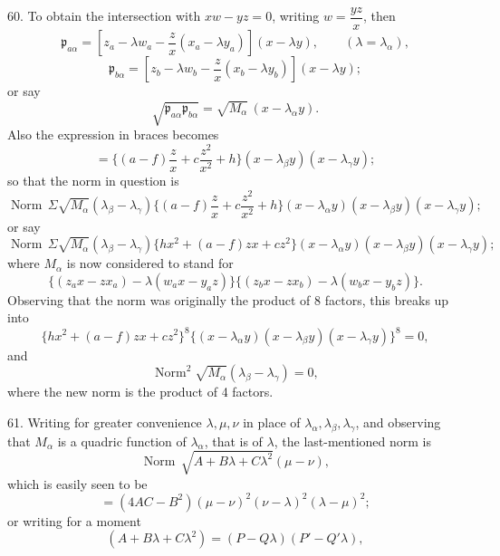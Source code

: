 \documentclass[11pt,a4paper]{article}
\newcommand{\p}{\mathfrak p}
\newcommand{\Norm}{\operatorname{Norm}}
\begin{document}
60. To obtain the intersection with $xw-yz=0$, writing $w=\dfrac{yz}{x}$, then
\[
\p_{a\alpha}=\left[z_a-\lambda w_a-\frac{z}{x}(x_a-\lambda y_a)\right]
(x-\lambda y),\qquad(\lambda=\lambda_\alpha),
\]
\[
\p_{b\alpha}=\left[z_b-\lambda w_b-\frac{z}{x}(x_b-\lambda y_b)\right]
(x-\lambda y);
\]
or say
\[
\sqrt{\p_{a\alpha}\p_{b\alpha}}=\sqrt{M_\alpha}\,(x-\lambda_\alpha y).
\]
Also the expression in braces becomes
\[
=\{(a-f)\frac{z}{x}+c\frac{z^2}{x^2}+h\}(x-\lambda_\beta y)(x-\lambda_\gamma y);
\]
so that the norm in question is
\[
\Norm\,\Sigma\sqrt{M_\alpha}(\lambda_\beta-\lambda_\gamma)
\{(a-f)\frac{z}{x}+c\frac{z^2}{x^2}+h\}
(x-\lambda_\alpha y)(x-\lambda_\beta y)(x-\lambda_\gamma y);
\]
or say
\[
\Norm\,\Sigma\sqrt{M_\alpha}(\lambda_\beta-\lambda_\gamma)
\{hx^2+(a-f)zx+cz^2\}
(x-\lambda_\alpha y)(x-\lambda_\beta y)(x-\lambda_\gamma y);
\]
where $M_\alpha$ is now considered to stand for
\[
\{(z_ax-zx_a)-\lambda(w_ax-y_az)\}
\{(z_bx-zx_b)-\lambda(w_bx-y_bz)\}.
\]
Observing that the norm was originally the product of 8 factors, this breaks up into
\[
\{hx^2+(a-f)zx+cz^2\}^8
\{(x-\lambda_\alpha y)(x-\lambda_\beta y)(x-\lambda_\gamma y)\}^8=0,
\]
and
\[
\Norm^2\sqrt{M_\alpha}(\lambda_\beta-\lambda_\gamma)=0,
\]
where the new norm is the product of 4 factors.

61. Writing for greater convenience $\lambda,\mu,\nu$ in place of
$\lambda_\alpha,\lambda_\beta,\lambda_\gamma$, and observing that $M_\alpha$ is a
quadric function of $\lambda_\alpha$, that is of $\lambda$, the last-mentioned norm is
\[
\Norm\,\sqrt{A+B\lambda+C\lambda^2}(\mu-\nu),
\]
which is easily seen to be
\[
=(4AC-B^2)(\mu-\nu)^2(\nu-\lambda)^2(\lambda-\mu)^2;
\]
or writing for a moment
\[
(A+B\lambda+C\lambda^2)=(P-Q\lambda)(P'-Q'\lambda),
\]
\end{document}
